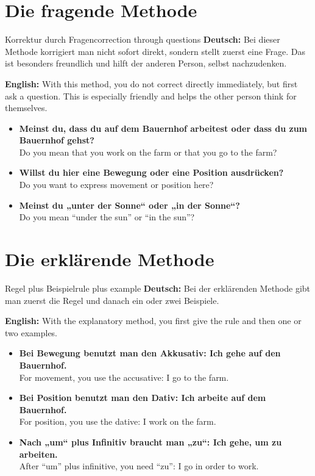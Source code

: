 \documentclass[a4paper,11pt]{article}
\newcommand{\GermanText}[1]{\textbf{Deutsch: }#1\par}
\newcommand{\EnglishText}[1]{{\small\color{SoftGray}\textbf{English: }#1\par}}
\newcommand{\ExampleItem}[2]{\item \textbf{#1}\\{\small\color{SoftGray}#2}}
\begin{document}
    
    \section{Die fragende Methode}
        
        \begin{grammarentry}{Korrektur durch Fragen}{correction through questions}
            \GermanText{Bei dieser Methode korrigiert man nicht sofort direkt, sondern stellt zuerst eine Frage. Das ist besonders freundlich und hilft der anderen Person, selbst nachzudenken.}
            \EnglishText{With this method, you do not correct directly immediately, but first ask a question. This is especially friendly and helps the other person think for themselves.}
            
            \begin{exbox}
                \begin{itemize}
                    \ExampleItem{Meinst du, dass du auf dem Bauernhof arbeitest oder dass du zum Bauernhof gehst?}{Do you mean that you work on the farm or that you go to the farm?}
                    \ExampleItem{Willst du hier eine Bewegung oder eine Position ausdrücken?}{Do you want to express movement or position here?}
                    \ExampleItem{Meinst du „unter der Sonne“ oder „in der Sonne“?}{Do you mean “under the sun” or “in the sun”?}
                \end{itemize}
            \end{exbox}
        \end{grammarentry}
    
    
    \section{Die erklärende Methode}
        
        \begin{grammarentry}{Regel plus Beispiel}{rule plus example}
            \GermanText{Bei der erklärenden Methode gibt man zuerst die Regel und danach ein oder zwei Beispiele.}
            \EnglishText{With the explanatory method, you first give the rule and then one or two examples.}
            
            \begin{exbox}
                \begin{itemize}
                    \ExampleItem{Bei Bewegung benutzt man den Akkusativ: Ich gehe auf den Bauernhof.}{For movement, you use the accusative: I go to the farm.}
                    \ExampleItem{Bei Position benutzt man den Dativ: Ich arbeite auf dem Bauernhof.}{For position, you use the dative: I work on the farm.}
                    \ExampleItem{Nach „um“ plus Infinitiv braucht man „zu“: Ich gehe, um zu arbeiten.}{After “um” plus infinitive, you need “zu”: I go in order to work.}
                \end{itemize}
            \end{exbox}
        \end{grammarentry}
    
\end{document}
